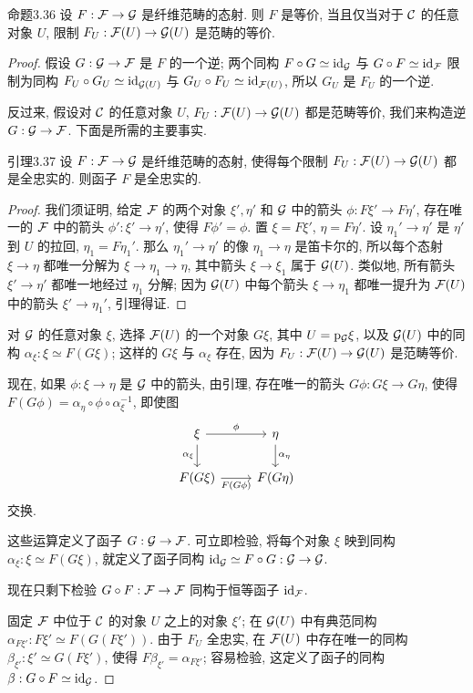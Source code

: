 \begin{origstatement}{命题}{3.36}\label{ch03:prop336}
设 $F:\mathcal F\to\mathcal G$ 是纤维范畴的态射. 则 $F$ 是等价, 当且仅当对于 $\mathcal C$ 的任意对象 $U$, 限制 $F_U:\mathcal F(U)\to\mathcal G(U)$ 是范畴的等价.
\end{origstatement}
\begin{proof}
假设 $G:\mathcal G\to\mathcal F$ 是 $F$ 的一个逆; 两个同构 $F\circ G\simeq\mathrm{id}_{\mathcal G}$ 与 $G\circ F\simeq\mathrm{id}_{\mathcal F}$ 限制为同构 $F_U\circ G_U\simeq\mathrm{id}_{\mathcal G(U)}$ 与 $G_U\circ F_U\simeq\mathrm{id}_{\mathcal F(U)}$, 所以 $G_U$ 是 $F_U$ 的一个逆.

反过来, 假设对 $\mathcal C$ 的任意对象 $U$, $F_U:\mathcal F(U)\to\mathcal G(U)$ 都是范畴等价, 我们来构造逆 $G:\mathcal G\to\mathcal F$. 下面是所需的主要事实.

\begin{origstatement}{引理}{3.37}\label{ch03:lem337}
设 $F:\mathcal F\to\mathcal G$ 是纤维范畴的态射, 使得每个限制 $F_U:\mathcal F(U)\to\mathcal G(U)$ 都是全忠实的. 则函子 $F$ 是全忠实的.
\end{origstatement}
\begin{proof}
我们须证明, 给定 $\mathcal F$ 的两个对象 $\xi',\eta'$ 和 $\mathcal G$ 中的箭头 $\phi:F\xi'\to F\eta'$, 存在唯一的 $\mathcal F$ 中的箭头 $\phi':\xi'\to\eta'$, 使得 $F\phi'=\phi$. 置 $\xi=F\xi'$, $\eta=F\eta'$. 设 $\eta_1'\to\eta'$ 是 $\eta'$ 到 $U$ 的拉回, $\eta_1=F\eta_1'$. 那么 $\eta_1'\to\eta'$ 的像 $\eta_1\to\eta$ 是笛卡尔的, 所以每个态射 $\xi\to\eta$ 都唯一分解为 $\xi\to\eta_1\to\eta$, 其中箭头 $\xi\to\xi_1$ 属于 $\mathcal G(U)$. 类似地, 所有箭头 $\xi'\to\eta'$ 都唯一地经过 $\eta_1$ 分解; 因为 $\mathcal G(U)$ 中每个箭头 $\xi\to\eta_1$ 都唯一提升为 $\mathcal F(U)$ 中的箭头 $\xi'\to\eta_1'$, 引理得证.
\end{proof}

对 $\mathcal G$ 的任意对象 $\xi$, 选择 $\mathcal F(U)$ 的一个对象 $G\xi$, 其中 $U=\mathrm p_{\mathcal G}\xi$, 以及 $\mathcal G(U)$ 中的同构 $\alpha_\xi:\xi\simeq F(G\xi)$; 这样的 $G\xi$ 与 $\alpha_\xi$ 存在, 因为 $F_U:\mathcal F(U)\to\mathcal G(U)$ 是范畴等价.

现在, 如果 $\phi:\xi\to\eta$ 是 $\mathcal G$ 中的箭头, 由引理, 存在唯一的箭头 $G\phi:G\xi\to G\eta$, 使得 $F(G\phi)=\alpha_\eta\circ\phi\circ\alpha_\xi^{-1}$, 即使图
\[
\begin{tikzcd}
\xi\arrow[r,"{\phi}"]\arrow[d,"{\alpha_\xi}"']&\eta\arrow[d,"{\alpha_\eta}"]\\
F(G\xi)\arrow[r,"{F(G\phi)}"']&F(G\eta)
\end{tikzcd}
\]
交换.

这些运算定义了函子 $G:\mathcal G\to\mathcal F$. 可立即检验, 将每个对象 $\xi$ 映到同构 $\alpha_\xi:\xi\simeq F(G\xi)$, 就定义了函子同构 $\mathrm{id}_{\mathcal G}\simeq F\circ G:\mathcal G\to\mathcal G$.

现在只剩下检验 $G\circ F:\mathcal F\to\mathcal F$ 同构于恒等函子 $\mathrm{id}_{\mathcal F}$.

固定 $\mathcal F$ 中位于 $\mathcal C$ 的对象 $U$ 之上的对象 $\xi'$; 在 $\mathcal G(U)$ 中有典范同构 $\alpha_{F\xi'}:F\xi'\simeq F(G(F\xi'))$. 由于 $F_U$ 全忠实, 在 $\mathcal F(U)$ 中存在唯一的同构 $\beta_{\xi'}:\xi'\simeq G(F\xi')$, 使得 $F\beta_{\xi'}=\alpha_{F\xi'}$; 容易检验, 这定义了函子的同构 $\beta:G\circ F\simeq\mathrm{id}_{\mathcal G}$.
\end{proof}

